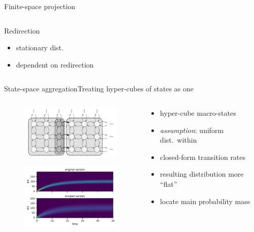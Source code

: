 \documentclass[9pt]{beamer}
\newcommand{\bottomcite}[1]{\vspace*{\fill} {\scriptsize \parencite{#1}}}
\begin{document}
\begin{frame}{Finite-space projection}
\begin{columns}
\begin{column}{.30\textwidth}
\begin{block}{Redirection}
                {\small
                \begin{itemize}
                    \item stationary dist.
                    \item dependent on redirection
                \end{itemize}
                }
            \end{block}
        \end{column}
    \end{columns}
\end{frame}

\begin{frame}{State-space aggregation}{Treating hyper-cubes of states as one}
    \begin{columns}
        \begin{column}{.4\textwidth}
            \begin{figure}
            \includegraphics[width=5cm]{../gfx/macro_states.pdf}
            \end{figure}
            \begin{figure}
                \includegraphics[width=50mm]{../gfx/lumpedvorig.pdf}
            \end{figure}
        \end{column}
        \begin{column}{.6\textwidth}
            \begin{itemize}
                \item hyper-cube macro-states
                \item \emph{assumption}: uniform dist.\ within
                \item closed-form transition rates
            \end{itemize}
            \vspace{17mm}
            \begin{itemize}
                \item resulting distribution more ``flat''
                \item locate main probability mass
            \end{itemize}
            \vspace{4mm}
        \end{column}
    \end{columns}
    \bottomcite{backenkohler2021abstraction}
\end{frame}
\end{document}
